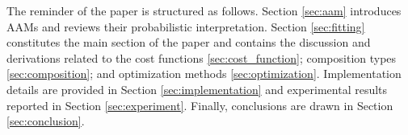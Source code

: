The reminder of the paper is structured as follows. Section \ref{sec:aam} introduces AAMs and reviews their probabilistic interpretation. Section \ref{sec:fitting} constitutes the main section of the paper and contains the discussion and derivations related to the cost functions \ref{sec:cost_function}; composition types \ref{sec:composition}; and optimization methods \ref{sec:optimization}. Implementation details are provided in Section \ref{sec:implementation} and experimental results reported in Section \ref{sec:experiment}. Finally, conclusions are drawn in Section \ref{sec:conclusion}.

